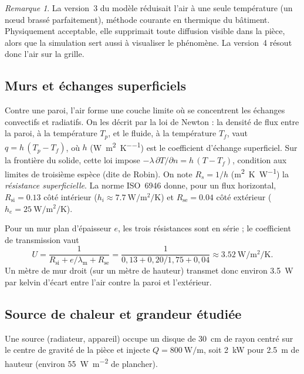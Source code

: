 \documentclass[11pt,a4paper]{article}
\theoremstyle{definition}
\theoremstyle{remark}
\newtheorem*{remarque}{Remarque}
\newcommand{\Rsi}{R_{\mathrm{si}}}
\newcommand{\Rse}{R_{\mathrm{se}}}
\newcommand{\lm}{\lambda_{\mathrm{m}}}
\begin{document}
\begin{remarque}
La version~3 du modèle réduisait l'air à une seule température (un nœud brassé
parfaitement), méthode courante en thermique du bâtiment. Physiquement acceptable,
elle supprimait toute diffusion visible dans la pièce, alors que la simulation sert
aussi à visualiser le phénomène. La version~4 résout donc l'air sur la grille.
\end{remarque}

\subsection{Murs et échanges superficiels}

Contre une paroi, l'air forme une couche limite où se concentrent les échanges
convectifs et radiatifs. On les décrit par la loi de Newton : la densité de flux
entre la paroi, à la température $T_p$, et le fluide, à la température $T_f$, vaut
$q = h\,(T_p - T_f)$, où $h$ (\unit{\watt\per\square\metre\per\kelvin}) est le
coefficient d'échange superficiel. Sur la frontière du solide, cette loi impose
$-\lambda\,\partial T/\partial n = h\,(T - T_f)$, condition aux limites de
troisième espèce (dite de Robin). On note $R_s = 1/h$
(\unit{\square\metre\kelvin\per\watt}) la \emph{résistance superficielle}. La norme
ISO~6946 \cite{iso6946} donne, pour un flux horizontal, $\Rsi = \num{0,13}$ côté
intérieur ($h_i \approx \qty{7,7}{\watt\per\square\metre\per\kelvin}$) et
$\Rse = \num{0,04}$ côté extérieur ($h_e = \qty{25}{\watt\per\square\metre\per\kelvin}$).

Pour un mur plan d'épaisseur $e$, les trois résistances sont en série ; le
coefficient de transmission vaut
\begin{equation}\label{eq-U}
U = \frac{1}{\Rsi + e/\lm + \Rse}
  = \frac{1}{0,13 + 0,20/1,75 + 0,04}
  \approx \qty{3,52}{\watt\per\square\metre\per\kelvin}.
\end{equation}
Un mètre de mur droit (sur un mètre de hauteur) transmet donc environ
\qty{3,5}{\watt} par kelvin d'écart entre l'air contre la paroi et l'extérieur.

\subsection{Source de chaleur et grandeur étudiée}

Une source (radiateur, appareil) occupe un disque de \qty{30}{\centi\metre} de rayon
centré sur le centre de gravité de la pièce et injecte
$Q = \qty{800}{\watt\per\metre}$, soit \qty{2}{\kilo\watt} pour \qty{2,5}{\metre} de
hauteur (environ \qty{55}{\watt\per\square\metre} de plancher).
\end{document}
